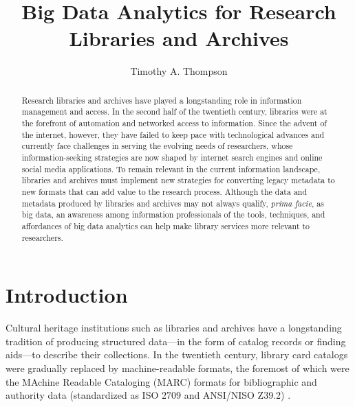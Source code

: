 \documentclass[sigconf]{acmart}
\begin{document}
\title{Big Data Analytics for Research Libraries and Archives}
\author{Timothy A. Thompson}

\begin{abstract}
Research libraries and archives have played a longstanding role in information management and access. In the second half of the twentieth century, libraries were at the forefront of automation and networked access to information. Since the advent of the internet, however, they have failed to keep pace with technological advances and currently face challenges in serving the evolving needs of researchers, whose information-seeking strategies are now shaped by internet search engines and online social media applications. To remain relevant in the current information landscape, libraries and archives must implement new strategies for converting legacy metadata to new formats that can add value to the research process. Although the data and metadata produced by libraries and archives may not always qualify, \textit{prima facie}, as big data, an awareness among information professionals of the tools, techniques, and affordances of big data analytics can help make library services more relevant to researchers.
\end{abstract}


\maketitle

\section{Introduction}
Cultural heritage institutions such as libraries and archives have a longstanding tradition of producing structured data---in the form of catalog records or finding aids---to describe their collections. In the twentieth century, library card catalogs were gradually replaced by machine-readable formats, the foremost of which were the MAchine Readable Cataloging (MARC) formats for bibliographic and authority data (standardized as ISO 2709 and ANSI/NISO Z39.2) \cite{kF12}. 
\end{document}
